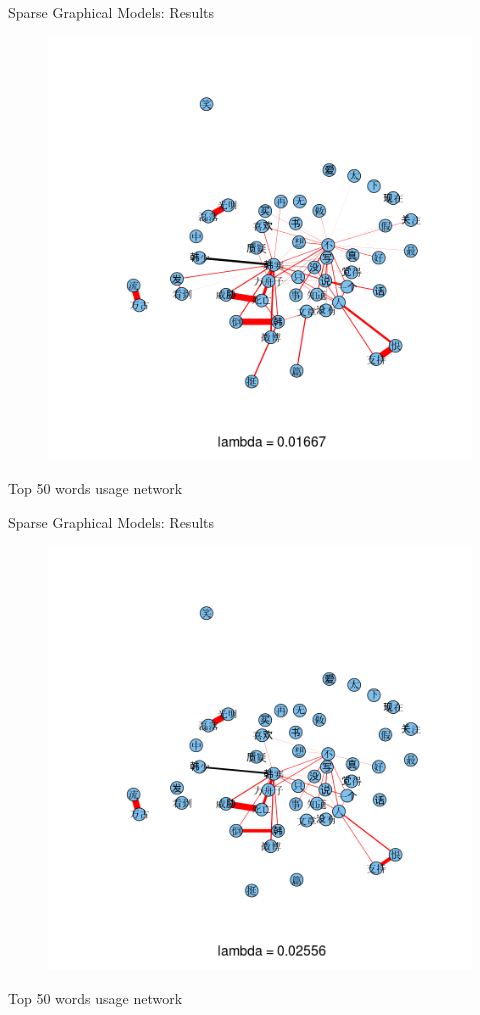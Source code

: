 \documentclass[12pt, trans]{beamer}
\newcommand{\1}[1]{{\mathbf 1}\left\{#1\right\}}        %
\begin{document}
\begin{frame}{Sparse Graphical Models: Results}

\begin{figure}
  \centering
  \includegraphics[height=0.9\textheight]{./../../gLassoResults/glasso4.png} 
\end{figure}
\center Top 50 words usage network

\end{frame}
\begin{frame}{Sparse Graphical Models: Results}

\begin{figure}
  \centering
  \includegraphics[height=0.9\textheight]{./../../gLassoResults/glasso5.png} 
\end{figure}
\center Top 50 words usage network

\end{frame}
\end{document}

